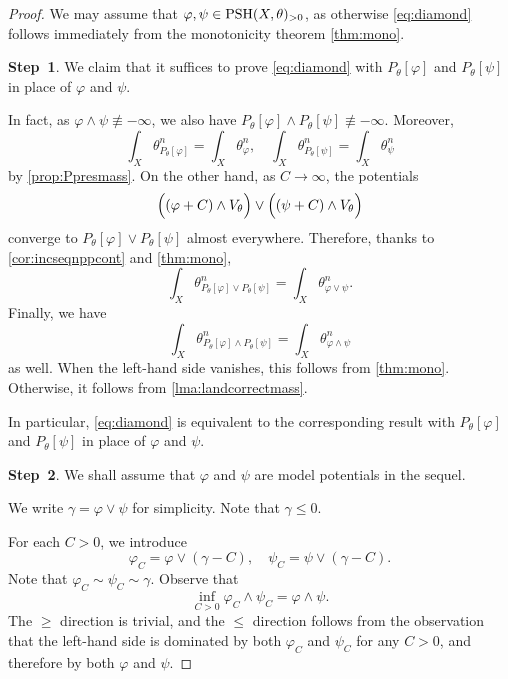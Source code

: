 \begin{proof}
    We may assume that $\varphi,\psi\in \mathrm{PSH}(X,\theta)_{>0}$, as otherwise \eqref{eq:diamond} follows immediately from the monotonicity theorem \cref{thm:mono}.

    \textbf{Step~1}. We claim that it suffices to prove \eqref{eq:diamond} with $P_{\theta}[\varphi]$ and $P_{\theta}[\psi]$ in place of $\varphi$ and $\psi$.

    In fact, as $\varphi\land \psi\not \equiv -\infty$, we also have $P_{\theta}[\varphi]\land P_{\theta}[\psi]\not\equiv -\infty$. Moreover,
    \[
    \int_X \theta_{P_{\theta}[\varphi]}^n=\int_X \theta_{\varphi}^n,\quad \int_X \theta_{P_{\theta}[\psi]}^n=\int_X \theta_{\psi}^n
    \]
    by \cref{prop:Ppresmass}. On the other hand, as $C\to \infty$, the potentials
    \[
        \Bigl( (\varphi+C)\land V_{\theta} \Bigr) \lor \Bigl( (\psi+C)\land V_{\theta} \Bigr)
    \]
    converge to $P_{\theta}[\varphi]\lor P_{\theta}[\psi]$ almost everywhere. Therefore, thanks to \cref{cor:incseqnppcont} and \cref{thm:mono},
    \[
    \int_X \theta_{P_{\theta}[\varphi]\lor P_{\theta}[\psi]}^n=\int_X \theta_{\varphi\lor \psi}^n.
    \]
    Finally, we have
    \[
    \int_X \theta_{P_{\theta}[\varphi]\land P_{\theta}[\psi]}^n= \int_X \theta_{\varphi\land\psi}^n
    \]
    as well. When the left-hand side vanishes, this follows from \cref{thm:mono}. Otherwise, it follows from \cref{lma:landcorrectmass}.

    In particular, \eqref{eq:diamond} is equivalent to the corresponding result with $P_{\theta}[\varphi]$ and $P_{\theta}[\psi]$ in place of $\varphi$ and $\psi$.

    \textbf{Step~2}. We shall assume that $\varphi$ and $\psi$ are model potentials in the sequel.

    We write $\gamma=\varphi\lor \psi$ for simplicity. Note that $\gamma\leq 0$.

    For each $C>0$, we introduce
    \[
    \varphi_C=\varphi\lor (\gamma-C),\quad \psi_C=\psi\lor (\gamma-C).
    \]
    Note that $\varphi_C\sim \psi_C\sim \gamma$. Observe that \[
        \inf_{C>0} \varphi_C\land \psi_C=\varphi\land\psi.
    \]
    The $\geq$ direction is trivial, and the $\leq$ direction follows from the observation that the left-hand side is dominated by both $\varphi_C$ and $\psi_C$ for any $C>0$, and therefore by both $\varphi$ and $\psi$.


\end{proof}
